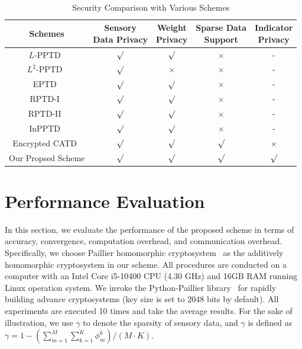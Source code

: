 \documentclass[conference]{IEEEtran}
\begin{document}
\begin{table}[htb]
  \centering
  \caption{Security Comparison with Various Schemes}~\label{tab:security}
  \linespread{1.3}\selectfont
  \begin{adjustbox}{max width=0.5\textwidth}
  \begin{tabular}{ccccc}
    \hline
    \hline
    Schemes & \makecell[c]{Sensory \\ Data Privacy} & \makecell[c]{Weight \\ Privacy} & \makecell[c]{Sparse Data \\ Support} & \makecell[c]{Indicator \\ Privacy} \\
    \hline
    $L$-PPTD~\cite{miao_lightweight_2017} & $\surd$ & $\surd$ & $\times$ & - \\
    $L^2$-PPTD~\cite{miao_lightweight_2017} & $\surd$ & $\times$ & $\times$ & - \\
    EPTD~\cite{xu_efficient_2019} & $\surd$ & $\surd$ & $\times$ & - \\
    RPTD-I~\cite{zhang_reliable_2019} & $\surd$ & $\surd$ & $\times$ & - \\
    RPTD-II~\cite{zhang_reliable_2019} & $\surd$ & $\surd$ & $\times$ & - \\
    InPPTD~\cite{xue_inpptd_2020} & $\surd$ & $\surd$ & $\times$ & - \\
    Encrypted CATD~\cite{zheng_learning_2018} & $\surd$ & $\surd$ & $\surd$ & $\times$ \\
    Our Propsed Scheme & $\surd$ & $\surd$ & $\surd$ & $\surd$ \\
    \hline
    \hline
  \end{tabular}  
  \end{adjustbox}
\end{table}

\section{Performance Evaluation}\label{sec7}
In this section, we evaluate the performance of the proposed scheme in terms of accuracy, convergence, computation overhead, and communication overhead.
Specifically, we choose Paillier homomorphic cryptosystem~\cite{paillier_public-key_1999} as the additively homomorphic cryptosystem in our scheme.
All procedures are conducted on a computer with an Intel Core i5-10400 CPU (4.30 GHz) and 16GB RAM running Linux operation system.
We invoke the Python-Paillier library~\cite{PythonPaillier} for rapidly building advance cryptosystems (key size is set to 2048 bits by default).
All experiments are executed 10 times and take the average results.
For the sake of illustration, we use $\gamma$ to denote the sparsity of sensory data, and $\gamma$ is defined as $\gamma = 1 - (\sum_{m=1}^M\sum_{k=1}^K\phi_m^k) / (M\cdot K)$.
\end{document}
